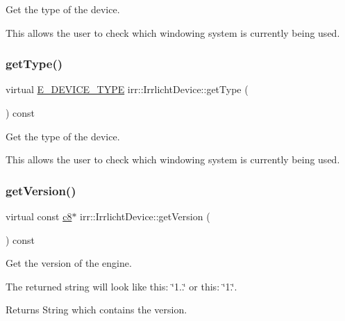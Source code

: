 Get the type of the device. 

This allows the user to check which windowing system is currently being used. \mbox{\label{classirr_1_1IrrlichtDevice_a2a2ec439b1f153169003c4d3e986a7d7}} 
\subsubsection{\texorpdfstring{get\+Type()}{getType()}\hspace{0.1cm}{\footnotesize\ttfamily [2/2]}}
{\footnotesize\ttfamily virtual \hyperlink{namespaceirr_ac25d94cf2e1037c7ca18ee79b3bd4505}{E\+\_\+\+D\+E\+V\+I\+C\+E\+\_\+\+T\+Y\+PE} irr\+::\+Irrlicht\+Device\+::get\+Type (\begin{DoxyParamCaption}{ }\end{DoxyParamCaption}) const\hspace{0.3cm}{\ttfamily [pure virtual]}}



Get the type of the device. 

This allows the user to check which windowing system is currently being used. \mbox{\label{classirr_1_1IrrlichtDevice_a4eb5bc1b15f552ce2c37d792231392f7}} 
\subsubsection{\texorpdfstring{get\+Version()}{getVersion()}\hspace{0.1cm}{\footnotesize\ttfamily [1/2]}}
{\footnotesize\ttfamily virtual const \hyperlink{namespaceirr_a9395eaea339bcb546b319e9c96bf7410}{c8}$\ast$ irr\+::\+Irrlicht\+Device\+::get\+Version (\begin{DoxyParamCaption}{ }\end{DoxyParamCaption}) const\hspace{0.3cm}{\ttfamily [pure virtual]}}



Get the version of the engine. 

The returned string will look like this\+: \char`\"{}1..\char`\"{} or this\+: \char`\"{}1.\char`\"{}. \begin{DoxyReturn}{Returns}
String which contains the version. 
\end{DoxyReturn}
\mbox{\label{classirr_1_1IrrlichtDevice_a4eb5bc1b15f552ce2c37d792231392f7}} 
